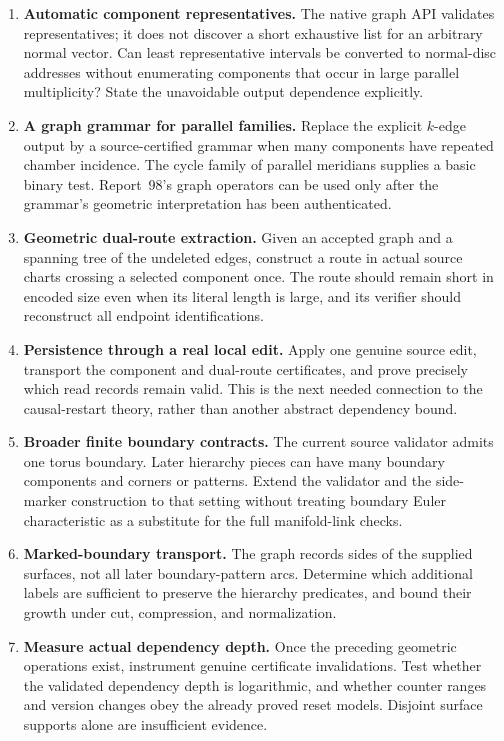 \begin{enumerate}[leftmargin=*,label=\textbf{\arabic*.}]
\item \textbf{Automatic component representatives.}
The native graph API validates representatives; it does not discover a
short exhaustive list for an arbitrary normal vector. Can least
representative intervals be converted to normal-disc addresses
without enumerating components that occur in large parallel
multiplicity? State the unavoidable output dependence explicitly.

\item \textbf{A graph grammar for parallel families.}
Replace the explicit \(k\)-edge output by a source-certified grammar
when many components have repeated chamber incidence. The cycle
family of parallel meridians supplies a basic binary test. Report~98's
graph operators can be used only after the grammar's geometric
interpretation has been authenticated.

\item \textbf{Geometric dual-route extraction.}
Given an accepted graph and a spanning tree of the undeleted edges,
construct a route in actual source charts crossing a selected
component once. The route should remain short in encoded size even
when its literal length is large, and its verifier should reconstruct
all endpoint identifications.

\item \textbf{Persistence through a real local edit.}
Apply one genuine source edit, transport the component and dual-route
certificates, and prove precisely which read records remain valid.
This is the next needed connection to the causal-restart theory,
rather than another abstract dependency bound.

\item \textbf{Broader finite boundary contracts.}
The current source validator admits one torus boundary. Later hierarchy
pieces can have many boundary components and corners or patterns.
Extend the validator and the side-marker construction to that setting
without treating boundary Euler characteristic as a substitute for
the full manifold-link checks.

\item \textbf{Marked-boundary transport.}
The graph records sides of the supplied surfaces, not all later
boundary-pattern arcs. Determine which additional labels are
sufficient to preserve the hierarchy predicates, and bound their
growth under cut, compression, and normalization.

\item \textbf{Measure actual dependency depth.}
Once the preceding geometric operations exist, instrument genuine
certificate invalidations. Test whether the validated dependency depth
is logarithmic, and whether counter ranges and version changes obey
the already proved reset models. Disjoint surface supports alone are
insufficient evidence.


\end{enumerate}
